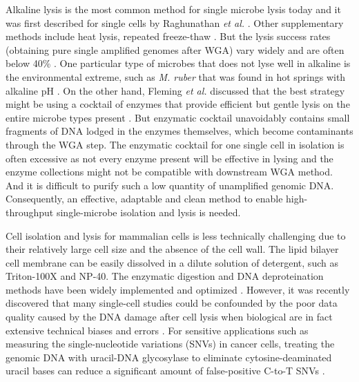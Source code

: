 Alkaline lysis is the most common method for single microbe lysis today and it was first described for single cells by Raghunathan \textit{et al.} \cite{Raghunathan:2005fg}. Other supplementary methods include heat lysis, repeated freeze-thaw \cite{Swan:2011hb,Fleming:2011dv}. But the lysis success rates (obtaining pure single amplified genomes after WGA) vary widely and are often below 40\%  \cite{Stepanauskas:2012ja}. One particular type of microbes that does not lyse well in alkaline is the environmental extreme, such as \textit{M. ruber} that was found in hot springs with alkaline pH \cite{NOBRE:1996ke}. On the other hand, Fleming \textit{et al.} discussed that the best strategy might be using a cocktail of enzymes that provide efficient but gentle lysis on the entire microbe types present \cite{Fleming:2011dv}. But enzymatic cocktail unavoidably contains small fragments of DNA lodged in the enzymes themselves, which become contaminants through the WGA step. The enzymatic cocktail for one single cell in isolation is often excessive as not every enzyme present will be effective in lysing and the enzyme collections might not be compatible with downstream WGA method. And it is difficult to purify such a low quantity of unamplified genomic DNA. Consequently, an effective, adaptable and clean method to enable high-throughput single-microbe isolation and lysis is needed. %

Cell isolation and lysis for mammalian cells is less technically challenging due to their relatively large cell size and the absence of the cell wall. The lipid bilayer cell membrane can be easily dissolved in a dilute solution of detergent, such as Triton-100X and NP-40. The enzymatic digestion and DNA deproteination methods have been widely implemented and optimized \cite{Zong:2012bs,Fu:2015gl,Leung:2016vx,Chen:2017hq,Dean:2002us}. However, it was recently discovered that many single-cell studies could be confounded by the poor data quality caused by the DNA damage after cell lysis when biological  are in fact extensive technical biases and errors \cite{Chen:2017hq,Chen:2017dq}. For sensitive applications such as measuring the single-nucleotide variations (SNVs) in cancer cells, treating the genomic DNA with uracil-DNA glycosylase to eliminate cytosine-deaminated uracil bases can reduce a significant amount of false-positive C-to-T SNVs \cite{Chen:2017hq,Rohland:2015uk}. 

